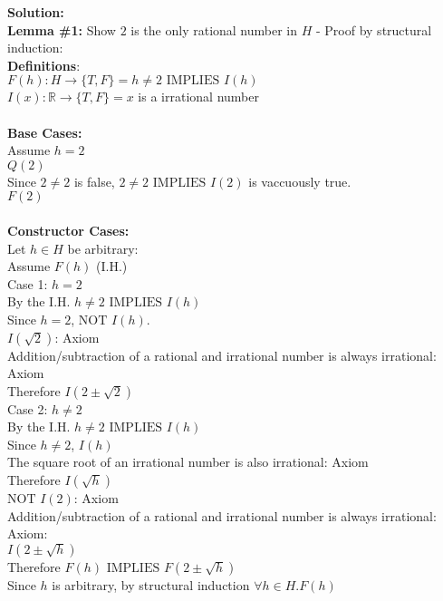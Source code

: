 \documentclass[11pt]{article}
\newcommand{\Implies}{\mbox{ IMPLIES }}
\newcommand{\Not}{\mbox{NOT }}
\begin{document}
\begin{enumerate}
\begin{solution}
{\bf Solution:}\\
{\bf Lemma \#1:} Show $2$ is the only rational number in $H$ - Proof by structural induction:\\
{\bf Definitions}:\\
$F(h): H \rightarrow \{T,F\} = h\ne 2\Implies I(h)$\\
$I(x): \mathbb{R} \rightarrow \{T,F\} = x$ is a irrational number\\\\
{\bf Base Cases: }\\
\null\quad Assume $h=2$\\
\null\quad $Q(2)$\\
\null\quad Since $2\ne2$ is false, $2\ne 2\Implies I(2)$ is vaccuously true.\\
$F(2)$\\\\
{\bf Constructor Cases: }\\
\null\quad Let $h\in H$ be arbitrary:\\
\null\qquad Assume $F(h)$ (I.H.)\\
\null\qquad Case 1: $h = 2$\\
\null\qquad By the I.H. $h\ne 2\Implies I(h)$\\
\null\qquad Since $h=2$, $\Not I(h)$.\\
\null\qquad $I(\sqrt 2)$: Axiom \\
\null\qquad Addition/subtraction of a rational and irrational number is always irrational: Axiom\\
\null\qquad Therefore $I(2\pm\sqrt2)$\\
\null\qquad Case 2: $h\ne2$\\
\null\qquad By the I.H. $h\ne 2\Implies I(h)$\\
\null\qquad Since $h\ne2$, $I(h)$\\
\null\qquad The square root of an irrational number is also irrational: Axiom\\
\null\qquad Therefore $I(\sqrt h)$\\
\null\qquad $\Not I(2)$: Axiom\\
\null\qquad Addition/subtraction of a rational and irrational number is always irrational: Axiom:\\
\null\qquad $I(2\pm\sqrt h)$\\
\null\quad Therefore $F(h)\Implies F(2\pm\sqrt h)$\\
Since $h$ is arbitrary, by structural induction $\forall h\in H.F(h)$\\

\end{solution}
\end{enumerate}
\end{document}
